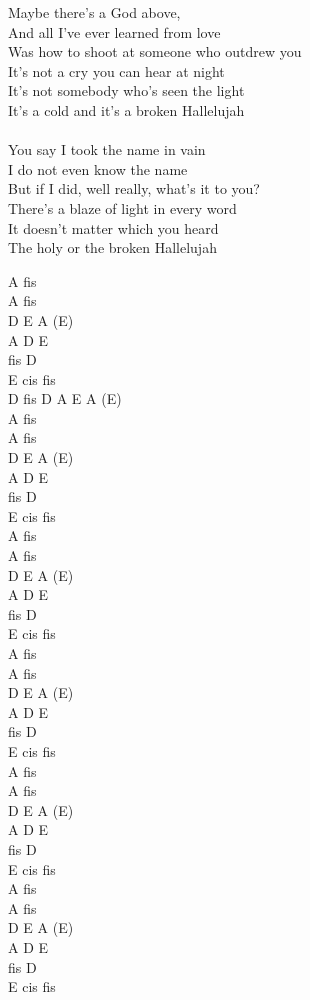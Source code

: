 \documentclass[a5paper, 10pt]{book}
\begin{document}
\begin{minipage}[t]{0.8\textwidth}
Maybe there's a God above,\\
And all I've ever learned from love\\
Was how to shoot at someone who outdrew you\\
It's not a cry you can hear at night\\
It's not somebody who's seen the light\\
It's a cold and it's a broken Hallelujah\\
\\
You say I took the name in vain\\
I do not even know the name\\
But if I did, well really, what's it to you?\\
There's a blaze of light in every word\\
It doesn't matter which you heard\\
The holy or the broken Hallelujah\\
\end{minipage}
\begin{minipage}[t]{0.2\textwidth}
 A fis\\
 A fis\\
 D E A (E)\\
 A D E\\
 fis D\\
 E cis fis\\
 
 D fis D A E A (E)\\

  A fis\\
 A fis\\
 D E A (E)\\
 A D E\\
 fis D\\
 E cis fis\\

  A fis\\
 A fis\\
 D E A (E)\\
 A D E\\
 fis D\\
 E cis fis\\

  A fis\\
 A fis\\
 D E A (E)\\
 A D E\\
 fis D\\
 E cis fis\\

  A fis\\
 A fis\\
 D E A (E)\\
 A D E\\
 fis D\\
 E cis fis\\

 A fis\\
 A fis\\
 D E A (E)\\
 A D E\\
 fis D\\
 E cis fis\\
\end{minipage}
\end{document}
